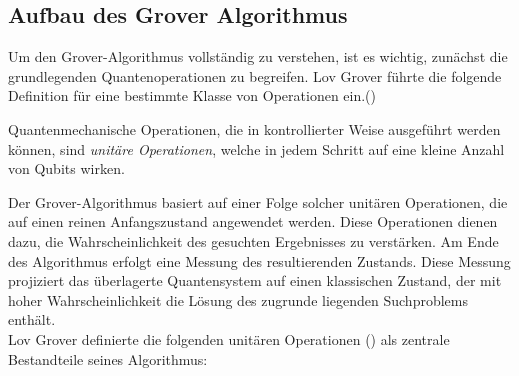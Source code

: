 \subsection{Aufbau des Grover Algorithmus}

Um den Grover-Algorithmus vollständig zu verstehen, ist es wichtig, zunächst die grundlegenden Quantenoperationen zu begreifen. Lov Grover führte die folgende Definition für eine bestimmte Klasse von Operationen ein.(\cite[1-2]{zotero-1211})

\begin{definition}
Quantenmechanische Operationen, die in kontrollierter Weise ausgeführt werden können, sind \emph{unitäre Operationen}, welche in jedem Schritt auf eine kleine Anzahl von Qubits wirken.
\end{definition}

Der Grover-Algorithmus basiert auf einer Folge solcher unitären Operationen, die auf einen reinen Anfangszustand angewendet werden. Diese Operationen dienen dazu, die Wahrscheinlichkeit des gesuchten Ergebnisses zu verstärken. Am Ende des Algorithmus erfolgt eine Messung des resultierenden Zustands. Diese Messung projiziert das überlagerte Quantensystem auf einen klassischen Zustand, der mit hoher Wahrscheinlichkeit die Lösung des zugrunde liegenden Suchproblems enthält.\\

Lov Grover definierte die folgenden unitären Operationen (\cite{zotero-1211}) als zentrale Bestandteile seines Algorithmus:


